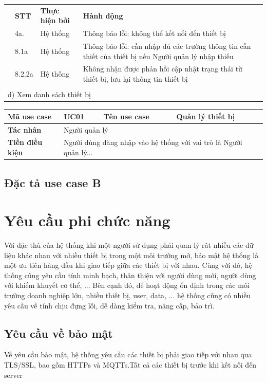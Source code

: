 \documentclass[../DoAn.tex]{subfiles}
\begin{document}
\begin{longtable}{|l|l|l|p{6cm}|}
{\begin{tabular}{|p{2cm}|c|c|p{6cm}|}
            \multirow{12}{}{\textbf{Luồng sự kiện thay thế}} & 
            \textbf{STT} & \textbf{Thực hiện bởi} & \textbf{Hành động} \\ \cline{2-4}
            & 4a.	 & Hệ thống	& Thông báo lỗi: không thể kết nối đến thiết bị\\ \cline{2-4}
            & 8.1a	 & Hệ thống	& Thông báo lỗi: cần nhập đủ các trường thông tin cần thiết của thiết bị nếu Người quản lý nhập thiếu\\ \cline{2-4}
            & 8.2.2a & Hệ thống	& Không nhận được phản hồi cập nhật trạng thái từ thiết bị, lưu lại thông tin thiết bị\\ \hline

            
        \end{tabular}
    } \\ \hline
    
    \multicolumn{4}{|l|}{d) Xem danh sách thiết bị} \\ \hline

\end{longtable}


\begin{tabular}{|l|l|l|p{4cm}|}
\hline
\textbf{Mã use case} & \textbf{UC01} & \textbf{Tên use case} & \textbf{Quản lý thiết bị} \\ \hline
\textbf{Tác nhân} & \multicolumn{3}{l|}{Người quản lý} \\ \hline
\textbf{Tiền điều kiện} & \multicolumn{3}{p{9cm}|}{Người dùng đăng nhập vào hệ thống với vai trò là Người quản lý...} \\ \hline

\end{tabular}


\subsection{Đặc tả use case B}
\hfill

\section{Yêu cầu phi chức năng}
\label{section:2.4}

Với đặc thù của hệ thống khi một người sử dụng phải quan lý rât nhiều các dữ liệu khác nhau với nhiều thiết bị trong một môi trường mở, bảo mật hệ thống là một ưu tiên hàng đầu khi giao tiếp giữa các thiết bị với nhau. Cùng với đó, hệ thống cũng yêu cầu tính minh bạch, thân thiện với người dùng mới, người dùng với khiếm khuyết cơ thể, ... Bên cạnh đó, để hoạt động ổn định trong các môi trường doanh nghiệp lớn, nhiều thiết bị, user, data, ... hệ thống cũng có nhiều yêu cầu về tính chịu đựng lỗi, dễ dàng kiểm tra, nâng cấp, bảo trì.

\subsection{Yêu cầu về bảo mật}
Về yêu cầu bảo mật, hệ thống yêu cầu các thiết bị phải giao tiếp với nhau qua TLS/SSL, bao gồm HTTPs và MQTTs.Tất cả các thiết bị trước khi kết nối đến server 
\end{document}
